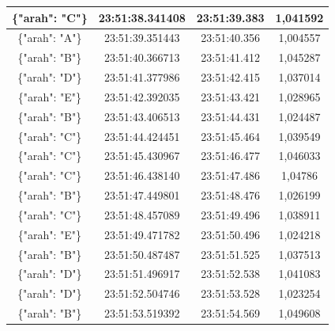 \begin{table}[htpb]
\begin{tabular}{|ccc|c|}
  \multicolumn{1}{|c|}{\{"arah": "C"\}} & \multicolumn{1}{c|}{23:51:38.341408} & 23:51:39.383       & 1,041592    \\ \hline
  \multicolumn{1}{|c|}{\{"arah": "A"\}} & \multicolumn{1}{c|}{23:51:39.351443} & 23:51:40.356       & 1,004557    \\ \hline
  \multicolumn{1}{|c|}{\{"arah": "B"\}} & \multicolumn{1}{c|}{23:51:40.366713} & 23:51:41.412       & 1,045287    \\ \hline
  \multicolumn{1}{|c|}{\{"arah": "D"\}} & \multicolumn{1}{c|}{23:51:41.377986} & 23:51:42.415       & 1,037014    \\ \hline
  \multicolumn{1}{|c|}{\{"arah": "E"\}} & \multicolumn{1}{c|}{23:51:42.392035} & 23:51:43.421       & 1,028965    \\ \hline
  \multicolumn{1}{|c|}{\{"arah": "B"\}} & \multicolumn{1}{c|}{23:51:43.406513} & 23:51:44.431       & 1,024487    \\ \hline
  \multicolumn{1}{|c|}{\{"arah": "C"\}} & \multicolumn{1}{c|}{23:51:44.424451} & 23:51:45.464       & 1,039549    \\ \hline
  \multicolumn{1}{|c|}{\{"arah": "C"\}} & \multicolumn{1}{c|}{23:51:45.430967} & 23:51:46.477       & 1,046033    \\ \hline
  \multicolumn{1}{|c|}{\{"arah": "C"\}} & \multicolumn{1}{c|}{23:51:46.438140} & 23:51:47.486       & 1,04786     \\ \hline
  \multicolumn{1}{|c|}{\{"arah": "B"\}} & \multicolumn{1}{c|}{23:51:47.449801} & 23:51:48.476       & 1,026199    \\ \hline
  \multicolumn{1}{|c|}{\{"arah": "C"\}} & \multicolumn{1}{c|}{23:51:48.457089} & 23:51:49.496       & 1,038911    \\ \hline
  \multicolumn{1}{|c|}{\{"arah": "E"\}} & \multicolumn{1}{c|}{23:51:49.471782} & 23:51:50.496       & 1,024218    \\ \hline
  \multicolumn{1}{|c|}{\{"arah": "B"\}} & \multicolumn{1}{c|}{23:51:50.487487} & 23:51:51.525       & 1,037513    \\ \hline
  \multicolumn{1}{|c|}{\{"arah": "D"\}} & \multicolumn{1}{c|}{23:51:51.496917} & 23:51:52.538       & 1,041083    \\ \hline
  \multicolumn{1}{|c|}{\{"arah": "D"\}} & \multicolumn{1}{c|}{23:51:52.504746} & 23:51:53.528       & 1,023254    \\ \hline
  \multicolumn{1}{|c|}{\{"arah": "B"\}} & \multicolumn{1}{c|}{23:51:53.519392} & 23:51:54.569       & 1,049608    \\ \hline

\end{tabular}
\end{table}
